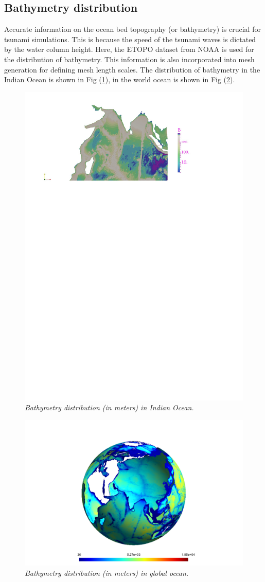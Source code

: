 \subsection{Bathymetry distribution}
Accurate information on the ocean bed topography (or bathymetry) is crucial for tsunami simulations. This is because the speed of the tsunami waves is dictated by the water column height. Here, the ETOPO  \cite{amante2009etopo1} dataset from NOAA is used for the distribution of bathymetry. This information is also incorporated into mesh generation for defining mesh length scales.  The distribution of bathymetry in the Indian Ocean is shown in Fig (\ref{fig:indian_ocean_bathy}), in the world ocean is shown in Fig (\ref{fig:world_ocean_bathy}).
\begin{figure}[h!]
\begin{center}
\centering
\includegraphics[trim=4.3cm 21.25cm 5.25cm 1.25cm,clip=true,width=0.5\linewidth]{./figures/IndianOceanBathy.pdf}
\caption{\emph{Bathymetry distribution (in meters) in Indian Ocean.}}
\label{fig:indian_ocean_bathy}
\end{center}
\end{figure}
\begin{figure}[h!]
\begin{center}
\centering
\includegraphics[trim=8cm 0cm 7cm 3cm,clip=true,width=0.5\linewidth]{./figures/globalOceanBathy.pdf}
\caption{\emph{Bathymetry distribution (in meters) in global ocean.}}
\label{fig:world_ocean_bathy}
\end{center}
\end{figure}

